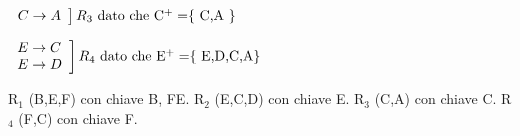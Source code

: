 \documentclass[12pt,a4paper]{article}
\begin{document}
    \(
    \left.
    \begin{array}{l}
    C \rightarrow A\\
    \end{array}
    \right] R_3 $ dato che C$^+ =$\{ C,A \}$
    \)
    \newline

    \(
    \left.
    \begin{array}{l}
    E \rightarrow C \\
    E \rightarrow D \\
    \end{array}
    \right] R_4$ dato che E$^+ = $\{ E,D,C,A\}$ 
    \)
    \newline

     \newline

    \noindent
    R$_1$ (B,E,F) con chiave B, FE. \newline
    R$_2$ (E,C,D) con chiave E. \newline
    R$_3$ (C,A) con chiave C. \newline
    R$_4$ (F,C) con chiave F. \newline
\end{document}
